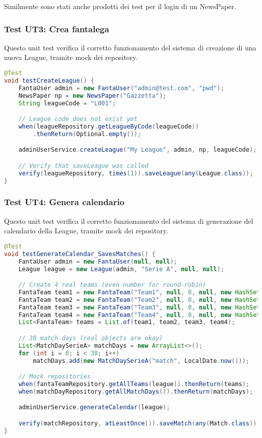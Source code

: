 Similmente sono stati anche prodotti dei test per il login di un NewsPaper.


\subsubsection{Test UT3: Crea fantalega} \label{UT3}

Questo unit test verifica il corretto funzionamento del sistema di creazione di una nuova League,
tramite mock dei repository.

\begin{lstlisting}[language=Java]
@Test
void testCreateLeague() {
	FantaUser admin = new FantaUser("admin@test.com", "pwd");
	NewsPaper np = new NewsPaper("Gazzetta");
	String leagueCode = "L001";

	// League code does not exist yet
	when(leagueRepository.getLeagueByCode(leagueCode))
        .thenReturn(Optional.empty());

	adminUserService.createLeague("My League", admin, np, leagueCode);

	// Verify that saveLeague was called
	verify(leagueRepository, times(1)).saveLeague(any(League.class));
}
\end{lstlisting}


\subsubsection{Test UT4: Genera calendario} \label{UT4}

Questo unit test verifica il corretto funzionamento del sistema di generazione del calendario della League,
tramite mock dei repository.

\begin{lstlisting}[language=Java]
@Test
void testGenerateCalendar_SavesMatches() {
	FantaUser admin = new FantaUser(null, null);
	League league = new League(admin, "Serie A", null, null);

	// Create 4 real teams (even number for round-robin)
	FantaTeam team1 = new FantaTeam("Team1", null, 0, null, new HashSet<>());
	FantaTeam team2 = new FantaTeam("Team2", null, 0, null, new HashSet<>());
	FantaTeam team3 = new FantaTeam("Team3", null, 0, null, new HashSet<>());
	FantaTeam team4 = new FantaTeam("Team4", null, 0, null, new HashSet<>());
	List<FantaTeam> teams = List.of(team1, team2, team3, team4);

	// 38 match days (real objects are okay)
	List<MatchDaySerieA> matchDays = new ArrayList<>();
	for (int i = 0; i < 38; i++)
		matchDays.add(new MatchDaySerieA("match", LocalDate.now()));

	// Mock repositories
	when(fantaTeamRepository.getAllTeams(league)).thenReturn(teams);
	when(matchDayRepository.getAllMatchDays()).thenReturn(matchDays);

	adminUserService.generateCalendar(league);

    verify(matchRepository, atLeastOnce()).saveMatch(any(Match.class));
}
\end{lstlisting}


